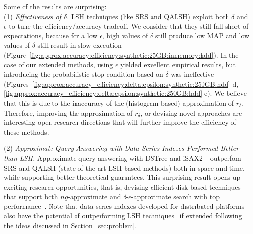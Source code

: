 {
Some of the results are surprising:
\\
(1) \emph{Effectiveness of $\delta$.} LSH techniques (like SRS and QALSH) exploit both $\delta$ and $\epsilon$ to tune the efficiency/accuracy tradeoff. We consider that they still fall short of expectations, because for a low $\epsilon$, high values of $\delta$ still produce low MAP and low values of $\delta$ still result in slow execution (Figure~\ref{fig:approx:accuracy:efficiency:synthetic:25GB:inmemory:hdd}). 
In the case of our extended methods, using $\epsilon$ yielded excellent empirical results, but introducing the probabilistic stop condition based on $\delta$ was ineffective (Figures~\ref{fig:approx:accuracy_efficiency:delta:epsilon:synthetic:250GB:hdd}-d,\ref{fig:approx:accuracy_efficiency:delta:epsilon:synthetic:250GB:hdd}-e). 
We believe that this is due to the inaccuracy of the (histogram-based) approximation of $r_{\delta}$. 
Therefore, %
improving the approximation of $r_{\delta}$, or devising novel approaches are interesting open research directions that will further improve the efficiency of these methods.  

(2) \emph{Approximate Query Answering with Data Series Indexes Performed Better than LSH.} 
Approximate query answering with DSTree and iSAX2+ outperfom SRS and QALSH (state-of-the-art LSH-based methods) both in space and time, while supporting better theoretical guarantees. 
This surprising result opens up exciting research opportunities, that is, devising efficient disk-based techniques that support both $ng$-approximate and $\delta$-$\epsilon$-approximate search with top performance~\cite{conf/vldb/echihabi19}. 
{\color{black} Note that data series indexes developed for distributed platforms~\cite{dpisax,conf/icde/zhang2019} also have the potential of outperforming LSH techniques~\cite{conf/cikm/bahmani2012,journal/pvdlb/sundaram2013} if extended following the ideas discussed in Section~\ref{sec:problem}.}

}
